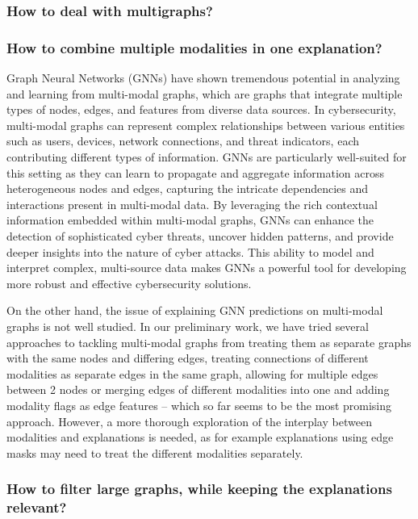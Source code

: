 \subsubsection{How to deal with multigraphs?}


\subsubsection{How to combine multiple modalities in one explanation?}

Graph Neural Networks (GNNs) have shown tremendous potential in analyzing and learning from multi-modal graphs, which are graphs that integrate multiple types of nodes, edges, and features from diverse data sources. In cybersecurity, multi-modal graphs can represent complex relationships between various entities such as users, devices, network connections, and threat indicators, each contributing different types of information. GNNs are particularly well-suited for this setting as they can learn to propagate and aggregate information across heterogeneous nodes and edges, capturing the intricate dependencies and interactions present in multi-modal data. By leveraging the rich contextual information embedded within multi-modal graphs, GNNs can enhance the detection of sophisticated cyber threats, uncover hidden patterns, and provide deeper insights into the nature of cyber attacks. This ability to model and interpret complex, multi-source data makes GNNs a powerful tool for developing more robust and effective cybersecurity solutions.

On the other hand, the issue of explaining GNN predictions on multi-modal graphs is not well studied. In our preliminary work, we have tried several approaches to tackling multi-modal graphs from treating them as separate graphs with the same nodes and differing edges, treating connections of different modalities as separate edges in the same graph, allowing for multiple edges between 2 nodes or merging edges of different modalities into one and adding modality flags as edge features -- which so far seems to be the most promising approach. However, a more thorough exploration of the interplay between modalities and explanations is needed, as for example explanations using edge masks may need to treat the different modalities separately.

\subsubsection{How to filter large graphs, while keeping the explanations relevant?}

